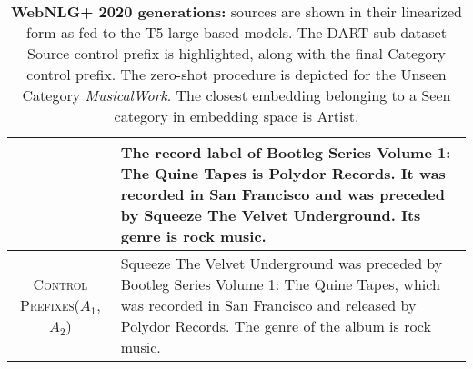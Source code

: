 \documentclass[11pt]{article}
\newcommand{\control}{\textsc{Control Prefixes}\xspace}
\newcommand{\bl}[1]{{\color{blue}  #1}}
\newcommand{\rd}[1]{{\color{red}  #1}}
\begin{document}
\begin{table*}[bth!]
\begin{tabular}{c|p{}}
& The record label of Bootleg Series Volume 1: The Quine Tapes is Polydor Records. It was recorded in San Francisco and was preceded by Squeeze The Velvet Underground. Its genre is rock music. \\\hline
\control ($A_{1}$,$A_{2}$)
& Squeeze The Velvet Underground was preceded by Bootleg Series Volume 1: The Quine Tapes, which was recorded in San Francisco and released by Polydor Records. The genre of the album is rock music. \\ \midrule \hline



  \end{tabular}
  \caption{\textbf{WebNLG+ 2020 generations:} sources are shown in their linearized form as fed to the T5-large based models. The DART sub-dataset \bl{Source} control prefix is highlighted, along with the final \rd{Category} control prefix. The zero-shot procedure is depicted for the Unseen Category \emph{MusicalWork}. The closest embedding belonging to a Seen category in embedding space is \rd{Artist}. }
  \label{tab:app_web20}
\end{table*}
\end{document}
